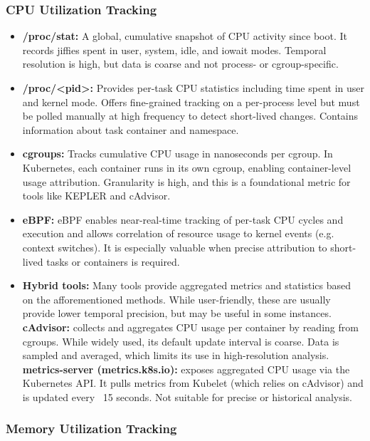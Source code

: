 \subsubsection*{CPU Utilization Tracking}

\begin{itemize}
    \item \textbf{/proc/stat:} A global, cumulative snapshot of CPU activity since boot. It records jiffies spent in user, system, idle, and iowait modes. Temporal resolution is high, but data is coarse and not process- or cgroup-specific.
    \item \textbf{/proc/\textless pid\textgreater :} Provides per-task CPU statistics including time spent in user and kernel mode. Offers fine-grained tracking on a per-process level but must be polled manually at high frequency to detect short-lived changes. Contains information about task container and namespace.
    \item \textbf{cgroups:} Tracks cumulative CPU usage in nanoseconds per cgroup. In Kubernetes, each container runs in its own cgroup, enabling container-level usage attribution. Granularity is high, and this is a foundational metric for tools like KEPLER and cAdvisor.
    \item \textbf{eBPF:} eBPF enables near-real-time tracking of per-task CPU cycles and execution and allows correlation of resource usage to kernel events (e.g. context switches). It is especially valuable when precise attribution to short-lived tasks or containers is required.
    \item \textbf{Hybrid tools:} Many tools provide aggregated metrics and statistics based on the afforementioned methods. While user-friendly, these are usually provide lower temporal precision, but may be useful in some instances. \textbf{cAdvisor:} collects and aggregates CPU usage per container by reading from cgroups. While widely used, its default update interval is coarse. Data is sampled and averaged, which limits its use in high-resolution analysis. \textbf{metrics-server (metrics.k8s.io):} exposes aggregated CPU usage via the Kubernetes API. It pulls metrics from Kubelet (which relies on cAdvisor) and is updated every ~15 seconds. Not suitable for precise or historical analysis.
\end{itemize}

\subsubsection*{Memory Utilization Tracking}

